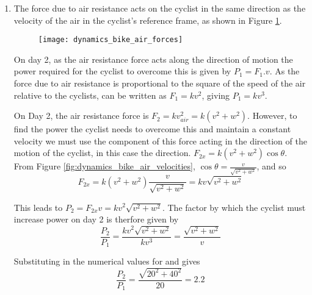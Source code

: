 \begin{problem}
{\begin{enumerate}
\item  The force due to air resistance acts on the cyclist in the same direction as the velocity of the air in the cyclist's reference frame, as shown in Figure \ref{fig:dynamics_bike_air_forces}.

\begin{figure}[h]
\centering
\texttt{[image: dynamics\_bike\_air\_forces]}
\caption{}
\label{fig:dynamics_bike_air_forces}
\end{figure}

On day 2, as the air resistance force acts along the direction of motion the power required for the cyclist to overcome this is given by $P_1 = F_1 . v$. As the force due to air resistance is proportional to the square of the speed of the air relative to the cyclists,  can be written as $F_1 = k v^2$, giving $P_1 = k v^3$.

On Day 2, the air resistance force is $F_2 = k v_{air}^2 = k (v^2 + w^2)$. However, to find the power the cyclist needs to overcome this and maintain a constant velocity we must use the component of this force acting in the direction of the motion of the cyclist, in this case the   direction. $F_{2x} = k (v^2 + w^2) \cos \theta$. From Figure  \ref{fig:dynamics_bike_air_velocities}, $ \cos \theta = \frac{v}{\sqrt{v^2 + w^2}}$, and so 
\begin{equation} F_{2x} = k (v^2 + w^2) \frac{v}{\sqrt{v^2 + w^2}} = kv \sqrt{v^2 + w^2}  \end{equation}

This leads to $P_2 = F_{2x} v = kv^2 \sqrt{v^2 + w^2}$. The factor by which the cyclist must increase power on day 2 is therfore given by
\begin{equation} \frac{P_2}{P_1} = \frac{ kv^2 \sqrt{v^2 + w^2}}{k v^3} = \frac{ \sqrt{v^2 + w^2}}{ v}\end{equation}

Substituting in the numerical values for  and  gives  
\begin{equation}\frac{P_2}{P_1}= \frac{ \sqrt{20^2 + 40^2}}{20} = 2.2\end{equation}

\end{enumerate}
}
\end{problem}
%


